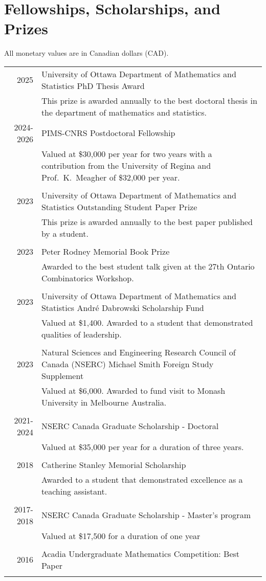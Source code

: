 \documentclass[letter,12pt]{article} %
\begin{document}
 \section{Fellowships, Scholarships, and Prizes}
 \vspace{3mm}
 
   All monetary values are in Canadian dollars (CAD). \hfill
   
 {\raggedleft
 \begin{longtable}{r p{13.5cm}}
2025 & University of Ottawa Department of Mathematics and Statistics PhD Thesis Award \\
& This prize is awarded annually to the best doctoral thesis in the department of mathematics and statistics.
     &\\[-3mm]
 2024-2026 & PIMS-CNRS Postdoctoral Fellowship\\
& Valued at \$30,000 per year for two years with a contribution from the University of Regina and Prof.~K.~Meagher of \$32,000 per year. \\
     &\\[-3mm]
 2023 & University of Ottawa Department of Mathematics and Statistics Outstanding Student Paper Prize\\
& This prize is awarded annually to the best paper published by a student. \\
     &\\[-3mm]
 2023 & Peter Rodney Memorial Book Prize\\
& Awarded to the best student talk given at the 27th  Ontario Combinatorics Workshop. \\
     &\\[-3mm]
 2023 &University of Ottawa Department of Mathematics and Statistics André Dabrowski Scholarship Fund\\
& Valued at \$1,400. Awarded to a student that demonstrated qualities of leadership.\\
     &\\[-3mm]
 2023 &Natural Sciences and Engineering Research Council of Canada (NSERC) Michael Smith Foreign Study Supplement\\
& Valued at \$6,000. Awarded to fund visit to Monash University in Melbourne Australia. \\
     &\\[-3mm]
 2021-2024 &NSERC Canada Graduate Scholarship - Doctoral\\
&  Valued at \$35,000 per year for a duration of three years. \\
     &\\[-3mm]
2018 &Catherine Stanley Memorial Scholarship\\
&  Awarded to a student that demonstrated excellence as a teaching assistant.\\
     &\\[-3mm]
2017-2018 &NSERC Canada Graduate Scholarship  - Master's program\\
& Valued at \$17,500 for a duration of one year\\
     &\\[-3mm]
2016  &Acadia Undergraduate Mathematics Competition: Best Paper\\
     &\\[-3mm]
 \end{longtable} 
}
\end{document}
